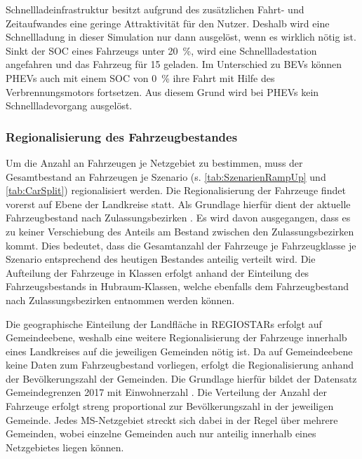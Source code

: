 

Schnellladeinfrastruktur besitzt aufgrund des zusätzlichen Fahrt- und Zeitaufwandes eine geringe Attraktivität für den Nutzer.
Deshalb wird eine Schnellladung in dieser Simulation nur dann ausgelöst, wenn es wirklich nötig ist.
Sinkt der \gls{SOC} eines Fahrzeugs unter \SI{20}{\percent}, wird eine Schnellladestation angefahren und das Fahrzeug für \SI{15}{\Minuten} geladen.
Im Unterschied zu \glspl{BEV} können \glspl{PHEV} auch mit einem \gls{SOC} von \SI{0}{\percent} ihre Fahrt mit Hilfe des Verbrennungsmotors fortsetzen.
Aus diesem Grund wird bei \glspl{PHEV} kein Schnellladevorgang ausgelöst.


\subsubsection{Regionalisierung des Fahrzeugbestandes}

Um die Anzahl an Fahrzeugen je Netzgebiet zu bestimmen, muss der Gesamtbestand an Fahrzeugen je Szenario (s. \autoref{tab:SzenarienRampUp} und \autoref{tab:CarSplit}) regionalisiert werden.
Die Regionalisierung der Fahrzeuge findet vorerst auf Ebene der Landkreise statt.
Als Grundlage hierfür dient der aktuelle Fahrzeugbestand nach Zulassungsbezirken \cite[][Stand: ]{KBAPLZ2020}.
Es wird davon ausgegangen, dass es zu keiner Verschiebung des Anteils am Bestand zwischen den Zulassungsbezirken kommt.
Dies bedeutet, dass die Gesamtanzahl der Fahrzeuge je Fahrzeugklasse je Szenario entsprechend des heutigen Bestandes anteilig verteilt wird.
Die Aufteilung der Fahrzeuge in Klassen erfolgt anhand der Einteilung des Fahrzeugsbestands in Hubraum-Klassen, welche ebenfalls dem Fahrzeugbestand nach Zulassungsbezirken entnommen werden können.\medskip

Die geographische Einteilung der Landfläche in \glspl{REGIOSTAR} erfolgt auf Gemeindeebene, weshalb eine weitere Regionalisierung der Fahrzeuge innerhalb eines Landkreises auf die jeweiligen Gemeinden nötig ist.
Da auf Gemeindeebene keine Daten zum Fahrzeugbestand vorliegen, erfolgt die Regionalisierung anhand der Bevölkerungszahl der Gemeinden.
Die Grundlage hierfür bildet der Datensatz \glqq Gemeindegrenzen 2017 mit Einwohnerzahl\grqq{} \cite[][Stand: ]{EDG2020}.
Die Verteilung der Anzahl der Fahrzeuge erfolgt streng proportional zur Bevölkerungszahl in der jeweiligen Gemeinde.
Jedes \gls{MS}-Netzgebiet streckt sich dabei in der Regel über mehrere Gemeinden, wobei einzelne Gemeinden auch nur anteilig innerhalb eines Netzgebietes liegen können.\medskip

